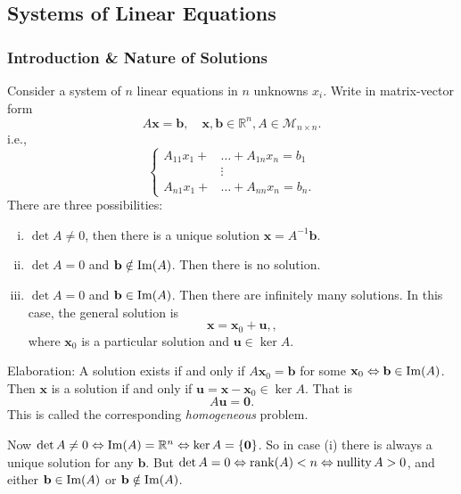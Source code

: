\documentclass[a4paper]{article}
\begin{document}
    \subsection{Systems of Linear Equations}
    \subsubsection{Introduction \& Nature of Solutions}
    Consider a system of $n$ linear equations in $n$ unknowns $x_i$.
    Write in matrix-vector form
    \[
      A\mathbf{x}=\mathbf{b},\quad \mathbf{x},\mathbf{b}\in
      \mathbb{R}^{n}, A\in \mathcal{M}_{n\times n}
    .\]
    i.e.,
    \[
      \left\lbrace
      \begin{aligned}
        A_{11} x_{1}+&\ldots+A_{1 n} x_{n}=b_{1} \\
        &\vdots\\
        A_{n 1} x_{1}+&\ldots+A_{n n} x_{n}=b_{n}.
      \end{aligned}\right.
    \]
    There are three possibilities:
    \begin{enumerate}[(i)]
      \item $ \det A\neq 0 $, then there is a unique solution $
        \mathbf{x}=A^{-1}\mathbf{b} $.
      \item $ \det A=0 $ and $ \mathbf{b}\notin \operatorname{Im}(A) $. Then there
        is no solution.
      \item $ \det A=0  $ and $ \mathbf{b}\in \operatorname{Im}(A) $. Then there
        are infinitely many solutions. In this case, the general solution is
        \[
          \mathbf{x}=\mathbf{x}_0+\mathbf{u},
        ,\]
        where $\mathbf{x}_0$ is a particular solution and
        $\mathbf{u}\in \ker A$.
    \end{enumerate}
    Elaboration: A solution exists if and only if $
    A\mathbf{x}_0=\mathbf{b} $ for some $ \mathbf{x}_0
    \Leftrightarrow \mathbf{b}\in \operatorname{Im}(A) $. Then $\mathbf{x}$ is a
    solution if and only if $\mathbf{u}=\mathbf{x}-\mathbf{x}_0\in
    \ker A$. That is
    \[
      A\mathbf{u}=\mathbf{0}
    .\]
    This is called the corresponding \textit{homogeneous} problem.

    Now $ \det A\neq 0 \Leftrightarrow \operatorname{Im}(A)=\mathbb{R}^{n}
    \Leftrightarrow \ker A=\{\mathbf{0}\} $. So in case (i) there is
    always a unique solution for any $\mathbf{b}$. But $ \det A=0
    \Leftrightarrow \rank(A)<n \Leftrightarrow \operatorname{nullity} A>0 $, and
    either $\mathbf{b}\in \operatorname{Im}(A)$ or $\mathbf{b}\notin\operatorname{Im}(A)$.
\end{document}
